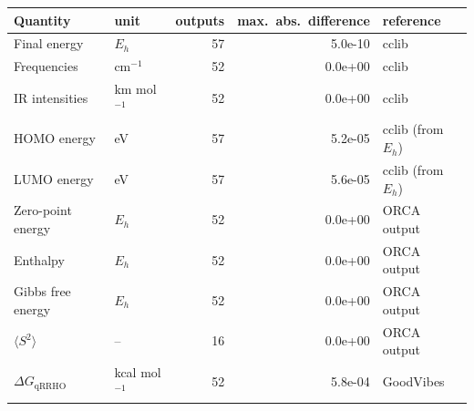 \begin{tabular}{llrrl}
\toprule
Quantity & unit & outputs & max.\ abs.\ difference & reference \\
\midrule
Final energy & $E_h$ & 57 & 5.0e-10 & cclib \\
Frequencies & cm$^{-1}$ & 52 & 0.0e+00 & cclib \\
IR intensities & km mol$^{-1}$ & 52 & 0.0e+00 & cclib \\
HOMO energy & eV & 57 & 5.2e-05 & cclib (from $E_h$) \\
LUMO energy & eV & 57 & 5.6e-05 & cclib (from $E_h$) \\
Zero-point energy & $E_h$ & 52 & 0.0e+00 & ORCA output \\
Enthalpy & $E_h$ & 52 & 0.0e+00 & ORCA output \\
Gibbs free energy & $E_h$ & 52 & 0.0e+00 & ORCA output \\
$\langle S^2\rangle$ & -- & 16 & 0.0e+00 & ORCA output \\
$\Delta G_{\mathrm{qRRHO}}$ & kcal mol$^{-1}$ & 52 & 5.8e-04 & GoodVibes \\
\bottomrule
\end{tabular}
